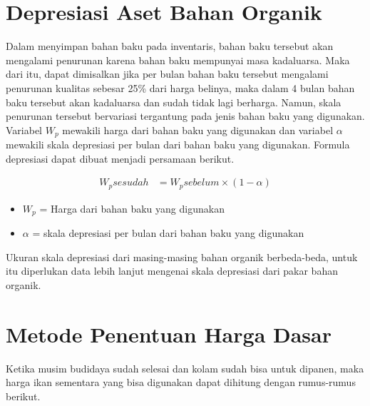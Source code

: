 \section{Depresiasi Aset Bahan Organik}

Dalam menyimpan bahan baku pada inventaris, bahan baku tersebut akan mengalami penurunan karena bahan baku mempunyai masa kadaluarsa. Maka dari itu, dapat dimisalkan jika per bulan bahan baku tersebut mengalami penurunan kualitas sebesar 25\% dari harga belinya, maka dalam 4 bulan bahan baku tersebut akan kadaluarsa dan sudah tidak lagi berharga. Namun, skala penurunan tersebut bervariasi tergantung pada jenis bahan baku yang digunakan. Variabel $W_p$ mewakili harga dari bahan baku yang digunakan dan variabel $\alpha$ mewakili skala depresiasi per bulan dari bahan baku yang digunakan. Formula depresiasi dapat dibuat menjadi persamaan berikut.

\begin{equation}
    \begin{split}
		W_psesudah
		&= W_psebelum\times(1 - \alpha)
    \end{split}
\end{equation}

\begin{itemize}
	\item $W_p$ = Harga dari bahan baku yang digunakan
	\item $\alpha$ = skala depresiasi per bulan dari bahan baku yang digunakan
\end{itemize}

Ukuran skala depresiasi dari masing-masing bahan organik berbeda-beda, untuk itu diperlukan data lebih lanjut mengenai skala depresiasi dari pakar bahan organik.

\section{Metode Penentuan Harga Dasar}

Ketika musim budidaya sudah selesai dan kolam sudah bisa untuk dipanen, maka harga ikan sementara yang bisa digunakan dapat dihitung dengan rumus-rumus berikut.


